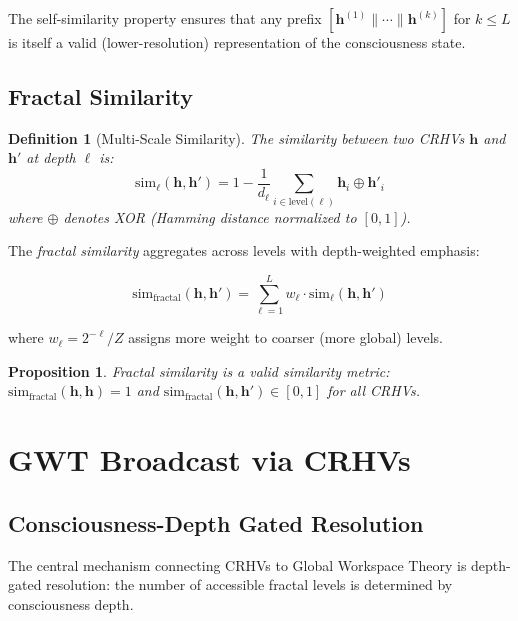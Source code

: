 \documentclass[11pt,a4paper]{article}
\newtheorem{definition}{Definition}
\newtheorem{proposition}{Proposition}
\begin{document}
The self-similarity property ensures that any prefix $[\mathbf{h}^{(1)} \| \cdots \| \mathbf{h}^{(k)}]$ for $k \leq L$ is itself a valid (lower-resolution) representation of the consciousness state.

\subsection{Fractal Similarity}

\begin{definition}[Multi-Scale Similarity]
The similarity between two CRHVs $\mathbf{h}$ and $\mathbf{h}'$ at depth $\ell$ is:
\begin{equation}
\text{sim}_\ell(\mathbf{h}, \mathbf{h}') = 1 - \frac{1}{d_\ell} \sum_{i \in \text{level}(\ell)} \mathbf{h}_i \oplus \mathbf{h}'_i
\end{equation}
where $\oplus$ denotes XOR (Hamming distance normalized to $[0,1]$).
\end{definition}

The \emph{fractal similarity} aggregates across levels with depth-weighted emphasis:

\begin{equation}
\text{sim}_{\text{fractal}}(\mathbf{h}, \mathbf{h}') = \sum_{\ell=1}^{L} w_\ell \cdot \text{sim}_\ell(\mathbf{h}, \mathbf{h}')
\end{equation}

where $w_\ell = 2^{-\ell} / Z$ assigns more weight to coarser (more global) levels.

\begin{proposition}
Fractal similarity is a valid similarity metric: $\text{sim}_{\text{fractal}}(\mathbf{h}, \mathbf{h}) = 1$ and $\text{sim}_{\text{fractal}}(\mathbf{h}, \mathbf{h}') \in [0, 1]$ for all CRHVs.
\end{proposition}

\section{GWT Broadcast via CRHVs}

\subsection{Consciousness-Depth Gated Resolution}

The central mechanism connecting CRHVs to Global Workspace Theory is depth-gated resolution: the number of accessible fractal levels is determined by consciousness depth.
\end{document}
